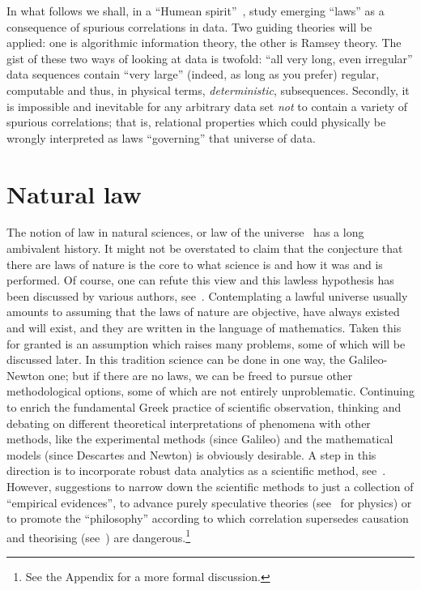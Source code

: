 \documentclass[12pt]{article}
\begin{document}
In what follows we shall,
in a ``Humean spirit''~\cite{Hume-Treatise},
study emerging ``laws'' as a consequence of spurious
correlations in data.
Two guiding theories will be applied: one is algorithmic information theory, the other is Ramsey theory.
The gist of these two ways of looking at data is twofold: ``all very long, even irregular'' data sequences
contain ``very large'' (indeed, as long as you prefer) regular,
computable and thus, in physical terms, {\em deterministic}, subsequences.
Secondly,
it is impossible and inevitable for any arbitrary data set {\em not} to contain a variety of spurious correlations; that is,
relational properties which could physically be  wrongly  interpreted as
laws ``governing'' that universe of data.




\section{Natural law}

The notion of law in  natural sciences, or law of  the universe~\cite{Beebee-Hume,sep-kant-hume-causality,Russell-1913-cause,mumford-causation,feynman-law} has a long
ambivalent history.
It might not be overstated to claim that
the conjecture
that there are laws of nature is the core to what science is and how it was and is performed.
Of course, one can refute this view and this lawless hypothesis   has been discussed by various authors,
see~\cite{laws1989,armstrong_1983,vanFraassen1989-VANLAS,calude1999islawful,lawlses_rosen2010,calude2013theeinai,chaos_multiverse2017,Mueller-2017,Cabello-2018-BornRule}.
Contemplating
a lawful universe usually amounts to assuming
that the laws of nature are objective,
have always existed and will exist,
and they are written in the language of mathematics.
Taken this for granted
is an assumption which raises many problems, some of which will be discussed later.
In this tradition science can
be done in one way,
the Galileo-Newton one; but if there are no laws,
 we can be freed to pursue  other methodological options, some of which are not entirely unproblematic.
Continuing to enrich
the fundamental Greek practice of scientific observation, thinking and debating on different theoretical interpretations of
phenomena with other  methods, like  the experimental methods (since Galileo) and the mathematical models
(since Descartes and Newton) is obviously desirable.
A step in this direction is to incorporate robust data analytics as a scientific method, see~\cite{miningMD2011,DS2012,doingDS1014,Reed:2015:ECB:2797100.2699414}. However,
suggestions to narrow down the scientific methods to just a collection of ``empirical evidences'',
to advance  purely speculative theories (see~\cite{nature_scmeth2014} for physics)
or  to promote the  ``philosophy'' according to which
correlation supersedes causation and theorising (see~\cite{suprious2016}) are dangerous.\footnote{See the Appendix for a more formal discussion.}
\end{document}
